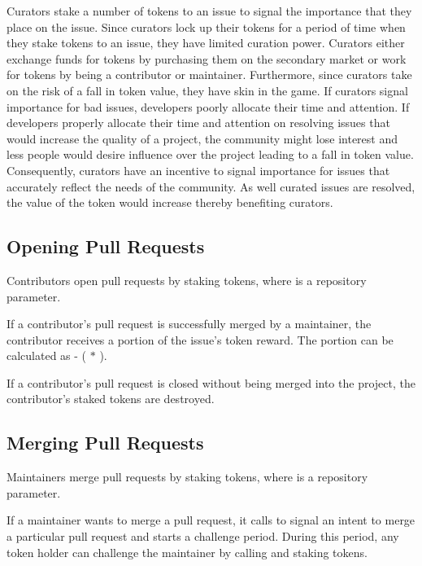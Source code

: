Curators stake a number of tokens to an issue to signal the importance that they
place on the issue. Since curators lock up their tokens for a period of time
when they stake tokens to an issue, they have limited curation power. Curators either exchange funds for tokens by purchasing them
on the secondary market or work for tokens by being a
contributor or maintainer. Furthermore, since curators take on the risk of a
fall in token value, they have skin in the game\cite{skininthegame}. If curators
signal importance for bad issues, developers poorly allocate their time and
attention. If developers properly allocate their time and attention on resolving
issues that would increase the quality of a project, the community might lose
interest and less people would desire influence over the project leading to a
fall in token value. Consequently, curators have an incentive to signal
importance for issues that accurately reflect the needs of the community. As
well curated issues are resolved, the value of the token would increase thereby
benefiting curators.

\subsection{Opening Pull Requests}

Contributors open pull requests by staking  tokens,
where  is a repository parameter.

If a contributor's pull request is successfully merged by a maintainer, the
contributor receives a portion of the issue's token reward. The portion can be
calculated as  - ( $*$ ).

If a contributor's pull request is closed without being merged into the project,
the contributor's  staked tokens are destroyed.

\subsection{Merging Pull Requests}
\label{sec:merge}

Maintainers merge pull requests by staking  tokens,
where  is a repository parameter.

If a maintainer wants to merge a pull request, it calls
 to signal an intent to merge a particular pull
request and starts a challenge period. During this period, any token holder can
challenge the maintainer by calling  and staking
 tokens.

